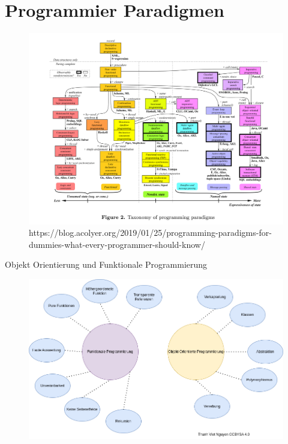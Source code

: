 \documentclass{beamer}
\begin{document}
\section{Programmier Paradigmen}
\begin{frame}
	\begin{figure}
	    \centering
	    \includegraphics[width=0.9\linewidth]{bilder/Programming-paradigms.png}
	    \textmd{ \tiny https://blog.acolyer.org/2019/01/25/programming-paradigms-for-dummies-what-every-programmer-should-know/}
	\end{figure}
\end{frame}

\begin{frame}{Objekt Orientierung und Funktionale Programmierung}
\begin{figure}
    \centering
    \includegraphics[scale=0.38]{bilder/Unterschiede.drawio.png}
\end{figure}

\end{frame}
\end{document}
